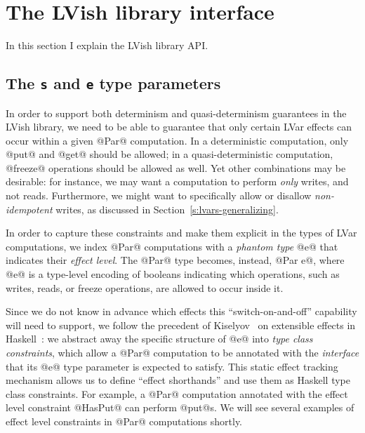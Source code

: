 \section{The LVish library interface}\label{s:lvish-api}

In this section I explain the LVish library API. 

\subsection{The \lstinline|s| and \lstinline|e| type parameters}

In order to support both determinism and quasi-determinism guarantees
in the LVish library, we need to be able to guarantee that only
certain LVar effects can occur within a given @Par@ computation.  In a
deterministic computation, only @put@ and @get@ should be allowed; in
a quasi-deterministic computation, @freeze@ operations should be
allowed as well.  Yet other combinations may be desirable: for
instance, we may want a computation to perform \emph{only} writes, and
not reads.  Furthermore, we might want to specifically allow or
disallow \emph{non-idempotent} writes, as discussed in
Section~\ref{s:lvars-generalizing}.

In order to capture these constraints and make them explicit in the
types of LVar computations, we index @Par@ computations with a
\emph{phantom type} @e@ that indicates their \emph{effect level}.  The
@Par@ type becomes, instead, @Par e@, where @e@ is a type-level
encoding of booleans indicating which operations, such as writes,
reads, or freeze operations, are allowed to occur inside it.

Since we do not know in advance which effects this
``switch-on-and-off'' capability will need to support, we follow the
precedent of Kiselyov \etal~on extensible effects in
Haskell~\cite{oleg-amr-haskell-2013}: we abstract away the specific
structure of @e@ into \emph{type class constraints}, which allow a
@Par@ computation to be annotated with the \emph{interface} that its
@e@ type parameter is expected to satisfy.  This static effect
tracking mechanism allows us to define ``effect shorthands'' and use
them as Haskell type class constraints.  For example, a @Par@
computation annotated with the effect level constraint @HasPut@ can
perform @put@s.  We will see several examples of effect level
constraints in @Par@ computations shortly.

